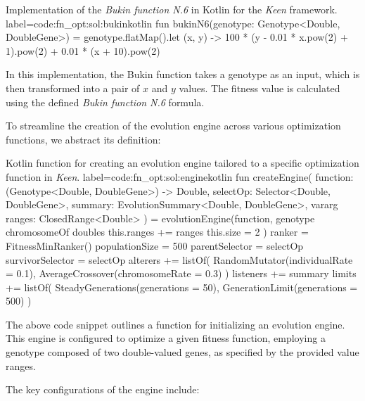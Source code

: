     \begin{code}{
      Implementation of the \textit{Bukin function N.6} in Kotlin for the 
      \textit{Keen} framework.
    }{label=code:fn_opt:sol:bukin}{kotlin}
      fun bukinN6(genotype: Genotype<Double, DoubleGene>) = genotype.flatMap().let { (x, y) ->
          100 * (y - 0.01 * x.pow(2) + 1).pow(2) + 0.01 * (x + 10).pow(2)
      }
    \end{code}

    In this implementation, the Bukin function takes a genotype as an input, 
    which is then transformed into a pair of \(x\) and \(y\) values. The fitness 
    value is calculated using the defined \textit{Bukin function N.6} formula.

    To streamline the creation of the evolution engine across various 
    optimization functions, we abstract its definition:

    \begin{code}{
      Kotlin function for creating an evolution engine tailored to a specific optimization function in \textit{Keen}.
    }{label=code:fn_opt:sol:engine}{kotlin}
      fun createEngine(
          function: (Genotype<Double, DoubleGene>) -> Double,
          selectOp: Selector<Double, DoubleGene>,
          summary: EvolutionSummary<Double, DoubleGene>,
          vararg ranges: ClosedRange<Double>
      ) = evolutionEngine(function, genotype {
          chromosomeOf {
              doubles {
                  this.ranges += ranges
                  this.size = 2
              }
          }
      }) {
          ranker = FitnessMinRanker()
          populationSize = 500
          parentSelector = selectOp
          survivorSelector = selectOp
          alterers += listOf(
              RandomMutator(individualRate = 0.1), 
              AverageCrossover(chromosomeRate = 0.3)
          )
          listeners += summary
          limits += listOf(
              SteadyGenerations(generations = 50), 
              GenerationLimit(generations = 500)
          )
      }
    \end{code}

    The above code snippet outlines a function for initializing an evolution 
    engine. This engine is configured to optimize a given fitness function, 
    employing a genotype composed of two double-valued genes, as specified by 
    the provided value ranges.

    The key configurations of the engine include:

